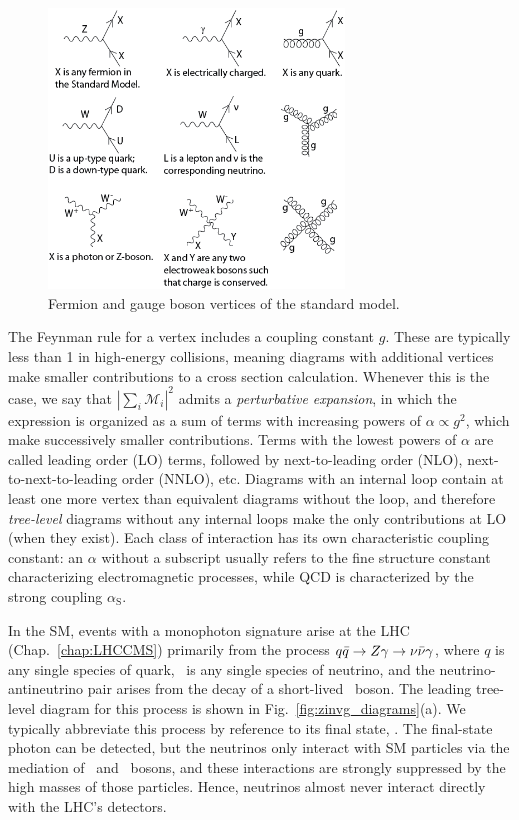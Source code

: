 \documentclass[oneside, letterpaper, 12pt, oldfontcommands]{memoir}
\begin{document}
\begin{figure}[hbtp]
  \begin{center}
    \includegraphics[width=0.7\textwidth]{Figures/Standard_Model_Feynman_Diagram_Vertices.png}
    \caption{
      Fermion and gauge boson vertices of the standard model.
    }
    \label{fig:sm_vertices}
  \end{center}
\end{figure}

The Feynman rule for a vertex includes a coupling constant $g$. These are typically less than 1 in high-energy collisions, meaning diagrams
with additional vertices make smaller contributions to a cross section calculation. Whenever this is the case, we say that
$|\sum_{i}{\mathcal{M}_{i}}|^{2}$ admits a \textit{perturbative expansion}, in which the expression is organized as a sum of terms with increasing powers
of $\alpha \propto g^{2}$, which make successively smaller contributions.
Terms with the lowest powers of $\alpha$ are called leading order (LO) terms, followed by next-to-leading order (NLO), next-to-next-to-leading order (NNLO), etc.
Diagrams with an internal loop contain at least one more vertex than equivalent diagrams without the loop, and therefore \textit{tree-level} diagrams without any internal loops
make the only contributions at LO (when they exist). Each class of interaction has its own characteristic coupling constant:
an $\alpha$ without a subscript usually refers to the fine structure constant characterizing electromagnetic processes, while QCD is characterized by the strong coupling $\alpha_\mathrm{S}$.

In the SM, events with a monophoton signature arise at the LHC (Chap.~\ref{chap:LHCCMS}) primarily from the process $q\bar{q} \to Z\gamma \to \nu\bar{\nu}\gamma$,
where $q$ is any single species of quark, \Pn\ is any single species of neutrino, and the neutrino-antineutrino pair arises from the decay
of a short-lived \PZ\ boson. The leading tree-level diagram for this process is shown in Fig.~\ref{fig:zinvg_diagrams}(a). We typically abbreviate this process by
reference to its final state, \zinvg. The final-state photon can be detected, but the neutrinos only interact with SM particles via the mediation
of \PZ\ and \PW\ bosons, and these interactions are strongly suppressed by the high masses of those particles. Hence, neutrinos almost never interact directly with the LHC's detectors.
\end{document}

